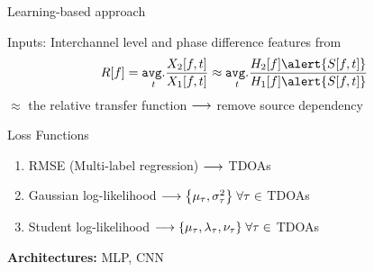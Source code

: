 \begin{frame}{Learning-based approach \hfill\iconDNN}

    \begin{block}{Inputs:}
        Interchannel level and phase difference features from
        \[
        R[f] = \timeavg \frac{X_2[f,t]}{X_1[f,t]}
        \approx \timeavg \frac{H_2[f]\alert{S[f,t]}}{H_1[f]\alert{S[f,t]}}
        \]
        $\approx$ the relative transfer function $\longrightarrow$ remove source dependency
    \end{block}
    \pause


    \pause[6]
    \begin{block}{Loss Functions}

        \vspace{-2mm}
        \begin{enumerate}
            \item RMSE (Multi-label regression) $\longrightarrow$ TDOAs
            \item Gaussian log-likelihood $\kto \kbrace{\mu_\tau, \sigma^2_\tau} \;\forall \tau \in$ TDOAs \hspace{1em}
            \item Student log-likelihood $\kto \kbrace{\mu_\tau, \lambda_\tau, \nu_\tau} \;\forall \tau \in$ TDOAs 
        \end{enumerate}
    \end{block}

    \pause[7]
    \begin{block}{}
        \textbf{Architectures:} MLP, CNN ~{\footnotesize\cite{chakrabarty2017broadband,nguyen2018autonomous}}
    \end{block}



\end{frame}
